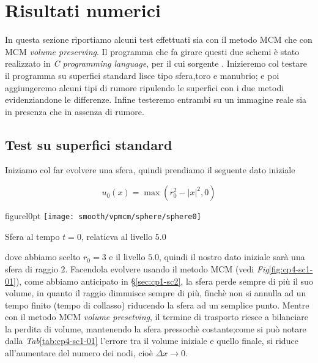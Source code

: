 %
\chapter{Risultati numerici}
\label{cap:cp4}

In questa sezione riportiamo alcuni test effettuati sia con il metodo
MCM che con MCM \emph{volume preserving}. Il programma che fa girare
questi due schemi è stato realizzato in \emph{C programming language},
per il cui sorgente \cite[vedi][]{vpmcm:code}. Inizieremo col testare
il programma su superfici standard lisce tipo sfera,toro e manubrio; e
poi aggiungeremo alcuni tipi di rumore ripulendo le superfici con i
due metodi evidenziandone le differenze. Infine testeremo entrambi su
un immagine reale sia in presenza che in assenza di rumore.

%
\section{Test su superfici standard}
\label{sec:cp4-sc1}
Iniziamo col far evolvere una sfera, quindi prendiamo il seguente dato
iniziale

\[
u_0(x) = \max\left(r_0^2-|x|^2,0\right)
\]


\begin{wrapfloat}{figure}{l}{0pt}
\texttt{[image: smooth/vpmcm/sphere/sphere0]}
\caption{Sfera al tempo $t=0$, relaticva al livello $5.0$}
\end{wrapfloat}

dove abbiamo scelto $r_0=3$ e il livello $5.0$, quindi il nostro dato
iniziale sarà una sfera di raggio $2$. Facendola evolvere usando il  metodo
MCM (vedi \emph{Fig}\ref{fig:cp4-sc1-01}), come abbiamo anticipato
in §\ref{sec:cp1-sc2}, la sfera perde sempre di più il suo volume, in
quanto il raggio dimnuisce sempre di più, finchè non si annulla ad un
tempo finito (tempo di collasso) riducendo la sfera ad un semplice punto. Mentre
con il metodo MCM \emph{volume presetving}, il termine di trasporto
riesce a bilanciare la perdita di volume, mantenendo la sfera pressochè
costante;come si può notare dalla \emph{Tab}\ref{tab:cp4-sc1-01}
 l'errore tra il volume iniziale e quello finale, si riduce
 all'aumentare del numero dei nodi, cioè $\Delta x\to 0$.

